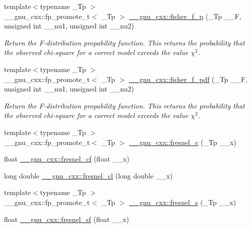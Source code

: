 \begin{DoxyCompactItemize}
{\footnotesize template$<$typename \+\_\+\+Tp $>$ }\\\+\_\+\+\_\+gnu\+\_\+cxx\+::fp\+\_\+promote\+\_\+t$<$ \+\_\+\+Tp $>$ \hyperlink{group__mathsf__gnu_ga1c769cbf42c1abecc6881cfe67dc6d14}{\+\_\+\+\_\+gnu\+\_\+cxx\+::fisher\+\_\+f\+\_\+p} (\+\_\+\+Tp \+\_\+\+\_\+F, unsigned int \+\_\+\+\_\+nu1, unsigned int \+\_\+\+\_\+nu2)
\begin{DoxyCompactList}\small\item\em Return the F-\/distribution propability function. This returns the probability that the observed chi-\/square for a correct model exceeds the value $ \chi^2 $. \end{DoxyCompactList}\item 
{\footnotesize template$<$typename \+\_\+\+Tp $>$ }\\\+\_\+\+\_\+gnu\+\_\+cxx\+::fp\+\_\+promote\+\_\+t$<$ \+\_\+\+Tp $>$ \hyperlink{group__mathsf__gnu_gac4564fd8e265c000675e0f38d656a18a}{\+\_\+\+\_\+gnu\+\_\+cxx\+::fisher\+\_\+f\+\_\+pdf} (\+\_\+\+Tp \+\_\+\+\_\+F, unsigned int \+\_\+\+\_\+nu1, unsigned int \+\_\+\+\_\+nu2)
\begin{DoxyCompactList}\small\item\em Return the F-\/distribution propability function. This returns the probability that the observed chi-\/square for a correct model exceeds the value $ \chi^2 $. \end{DoxyCompactList}\item 
{\footnotesize template$<$typename \+\_\+\+Tp $>$ }\\\+\_\+\+\_\+gnu\+\_\+cxx\+::fp\+\_\+promote\+\_\+t$<$ \+\_\+\+Tp $>$ \hyperlink{group__mathsf__gnu_ga92a3585165bfad3f9972fb4210140d22}{\+\_\+\+\_\+gnu\+\_\+cxx\+::fresnel\+\_\+c} (\+\_\+\+Tp \+\_\+\+\_\+x)
\item 
float \hyperlink{group__mathsf__gnu_ga02ca7579d5aef96cba69e38e988e7a42}{\+\_\+\+\_\+gnu\+\_\+cxx\+::fresnel\+\_\+cf} (float \+\_\+\+\_\+x)
\item 
long double \hyperlink{group__mathsf__gnu_gaa3f82a7569d61c2f7c194d2e64b616f8}{\+\_\+\+\_\+gnu\+\_\+cxx\+::fresnel\+\_\+cl} (long double \+\_\+\+\_\+x)
\item 
{\footnotesize template$<$typename \+\_\+\+Tp $>$ }\\\+\_\+\+\_\+gnu\+\_\+cxx\+::fp\+\_\+promote\+\_\+t$<$ \+\_\+\+Tp $>$ \hyperlink{group__mathsf__gnu_ga075a32b4f59a5fa67c2e28232c89ad45}{\+\_\+\+\_\+gnu\+\_\+cxx\+::fresnel\+\_\+s} (\+\_\+\+Tp \+\_\+\+\_\+x)
\item 
float \hyperlink{group__mathsf__gnu_ga73450b8fd4abd5d8d3191dd6cbcda808}{\+\_\+\+\_\+gnu\+\_\+cxx\+::fresnel\+\_\+sf} (float \+\_\+\+\_\+x)

\end{DoxyCompactItemize}
